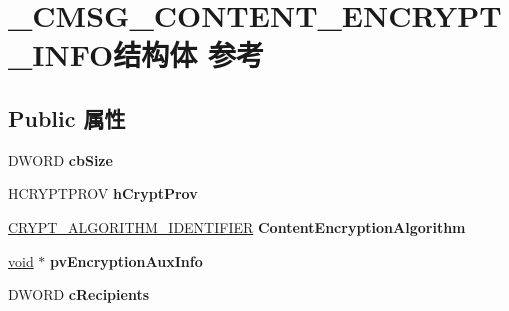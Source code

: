 \hypertarget{struct___c_m_s_g___c_o_n_t_e_n_t___e_n_c_r_y_p_t___i_n_f_o}{}\section{\+\_\+\+C\+M\+S\+G\+\_\+\+C\+O\+N\+T\+E\+N\+T\+\_\+\+E\+N\+C\+R\+Y\+P\+T\+\_\+\+I\+N\+F\+O结构体 参考}
\label{struct___c_m_s_g___c_o_n_t_e_n_t___e_n_c_r_y_p_t___i_n_f_o}
\subsection*{Public 属性}
\begin{DoxyCompactItemize}
\item 
\mbox{\label{struct___c_m_s_g___c_o_n_t_e_n_t___e_n_c_r_y_p_t___i_n_f_o_a3c8c31464754038e1563868a9dfe7c67}} 
D\+W\+O\+RD {\bfseries cb\+Size}
\item 
\mbox{\label{struct___c_m_s_g___c_o_n_t_e_n_t___e_n_c_r_y_p_t___i_n_f_o_a662c6f06a6904722741b9c1d7770fddc}} 
H\+C\+R\+Y\+P\+T\+P\+R\+OV {\bfseries h\+Crypt\+Prov}
\item 
\mbox{\label{struct___c_m_s_g___c_o_n_t_e_n_t___e_n_c_r_y_p_t___i_n_f_o_a8e134dbe1b2489a5aa2cde5e0260bcc9}} 
\hyperlink{struct___c_r_y_p_t___a_l_g_o_r_i_t_h_m___i_d_e_n_t_i_f_i_e_r}{C\+R\+Y\+P\+T\+\_\+\+A\+L\+G\+O\+R\+I\+T\+H\+M\+\_\+\+I\+D\+E\+N\+T\+I\+F\+I\+ER} {\bfseries Content\+Encryption\+Algorithm}
\item 
\mbox{\label{struct___c_m_s_g___c_o_n_t_e_n_t___e_n_c_r_y_p_t___i_n_f_o_a24a314806bb066d9181163b242396040}} 
\hyperlink{interfacevoid}{void} $\ast$ {\bfseries pv\+Encryption\+Aux\+Info}
\item 
\mbox{\label{struct___c_m_s_g___c_o_n_t_e_n_t___e_n_c_r_y_p_t___i_n_f_o_ae398475c8fdf188558c71509034b985f}} 
D\+W\+O\+RD {\bfseries c\+Recipients}
\item 

\end{DoxyCompactItemize}
